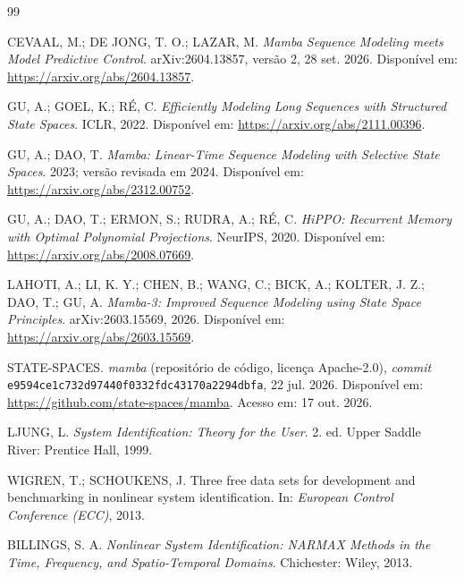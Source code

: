 \documentclass[11pt,a4paper]{article}
\begin{document}
\begin{thebibliography}{99}\small\itemsep0pt

 CEVAAL, M.; DE JONG, T. O.; LAZAR, M. \emph{Mamba Sequence Modeling meets Model
Predictive Control}. arXiv:2604.13857, versão 2, 28 set. 2026. Disponível em:
\url{https://arxiv.org/abs/2604.13857}.

 GU, A.; GOEL, K.; RÉ, C. \emph{Efficiently Modeling Long Sequences with
Structured State Spaces}. ICLR, 2022. Disponível em: \url{https://arxiv.org/abs/2111.00396}.

 GU, A.; DAO, T. \emph{Mamba: Linear-Time Sequence Modeling with Selective State
Spaces}. 2023; versão revisada em 2024. Disponível em: \url{https://arxiv.org/abs/2312.00752}.

 GU, A.; DAO, T.; ERMON, S.; RUDRA, A.; RÉ, C. \emph{HiPPO: Recurrent Memory
with Optimal Polynomial Projections}. NeurIPS, 2020. Disponível em:
\url{https://arxiv.org/abs/2008.07669}.

 LAHOTI, A.; LI, K. Y.; CHEN, B.; WANG, C.; BICK, A.; KOLTER, J. Z.; DAO, T.;
GU, A. \emph{Mamba-3: Improved Sequence Modeling using State Space Principles}. arXiv:2603.15569, 2026. Disponível em: \url{https://arxiv.org/abs/2603.15569}.

 STATE-SPACES. \emph{mamba} (repositório de código, licença Apache-2.0),
\emph{commit} \texttt{e9594ce1c732d97440f0332fdc43170a2294dbfa}, 22 jul. 2026. Disponível em:
\url{https://github.com/state-spaces/mamba}. Acesso em: 17 out. 2026.

 LJUNG, L. \emph{System Identification: Theory for the User}. 2. ed. Upper Saddle
River: Prentice Hall, 1999.

 WIGREN, T.; SCHOUKENS, J. Three free data sets for development and benchmarking in
nonlinear system identification. In: \emph{European Control Conference (ECC)}, 2013.

 BILLINGS, S. A. \emph{Nonlinear System Identification: NARMAX Methods in the
Time, Frequency, and Spatio-Temporal Domains}. Chichester: Wiley, 2013.

\end{thebibliography}
\end{document}
